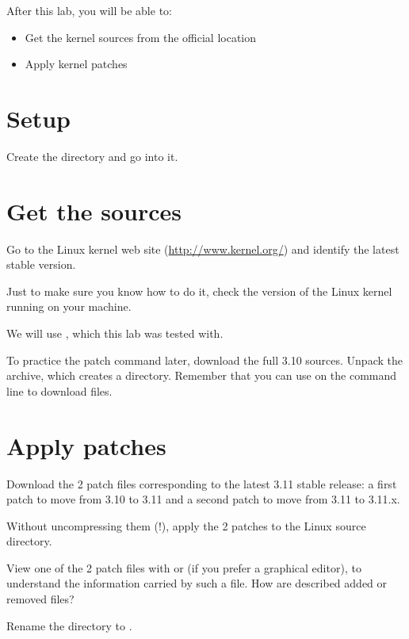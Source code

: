
After this lab, you will be able to:
\begin{itemize}
\item Get the kernel sources from the official location
\item Apply kernel patches
\end{itemize}

\section{Setup}

Create the  directory and go into it.

\section{Get the sources}

Go to the Linux kernel web site (\url{http://www.kernel.org/}) and
identify the latest stable version.

Just to make sure you know how to do it, check the version of the
Linux kernel running on your machine.

We will use , which this lab was tested with.

To practice the patch command later, download the full 3.10
sources. Unpack the archive, which creates a 
directory. Remember that you can use  on the command
line to download files.

\section{Apply patches}

Download the 2 patch files corresponding to the latest 3.11 stable
release: a first patch to move from 3.10 to 3.11 and a second patch to
move from 3.11 to 3.11.x.

Without uncompressing them (!), apply the 2 patches to the Linux
source directory.

View one of the 2 patch files with  or 
(if you prefer a graphical editor), to understand the information carried
by such a file. How are described added or removed files?

Rename the  directory to .

